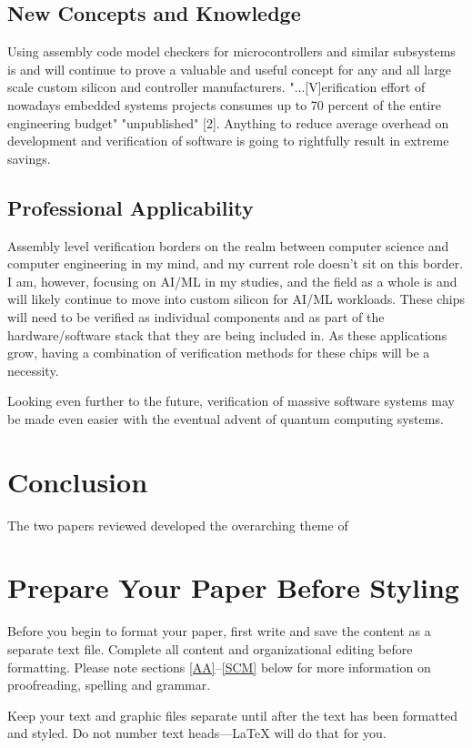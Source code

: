 \documentclass[conference]{IEEEtran}
\begin{document}
\subsection{New Concepts and Knowledge}
Using assembly code model checkers for microcontrollers and similar subsystems is and will continue to prove a valuable and useful concept for any and all large scale custom silicon and controller manufacturers. "...[V]erification effort of nowadays embedded systems projects consumes up to 70 percent of the entire engineering budget" "unpublished" [2]. Anything to reduce average overhead on development and verification of software is going to rightfully result in extreme savings.

\subsection{Professional Applicability}
Assembly level verification borders on the realm between computer science and computer engineering in my mind, and my current role doesn't sit on this border. I am, however, focusing on AI/ML in my studies, and the field as a whole is and will likely continue to move into custom silicon for AI/ML workloads. These chips will need to be verified as individual components and as part of the hardware/software stack that they are being included in. As these applications grow, having a combination of verification methods for these chips will be a necessity.

Looking even further to the future, verification of massive software systems may be made even easier with the eventual advent of quantum computing systems.

\section{Conclusion}
The two papers reviewed developed the overarching theme of 

\section{Prepare Your Paper Before Styling}
Before you begin to format your paper, first write and save the content as a 
separate text file. Complete all content and organizational editing before 
formatting. Please note sections \ref{AA}--\ref{SCM} below for more information on 
proofreading, spelling and grammar.

Keep your text and graphic files separate until after the text has been 
formatted and styled. Do not number text heads---{\LaTeX} will do that 
for you.
\end{document}
